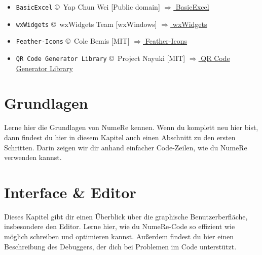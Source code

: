\documentclass[DIV=17, parskip=half]{scrreprt}
\begin{document}
\begin{itemize}
			\item \verb!BasicExcel! \copyright\ Yap Chun Wei [Public domain]
			\href{https://www.codeproject.com/Articles/13852/BasicExcel-A-Class-to-Read-and-Write-to-Microsoft}{$\Rightarrow$ BasicExcel}

			\item \verb!wxWidgets! \copyright\ wxWidgets Team [wxWindows]
			\href{https://www.wxwidgets.org/}{$\Rightarrow$ wxWidgets}

			\item \verb!Feather-Icons! \copyright\ Cole Bemis [MIT]
			\href{https://feathericons.com/}{$\Rightarrow$ Feather-Icons}

			\item \verb!QR Code Generator Library! \copyright\ Project Nayuki [MIT]
			\href{https://www.nayuki.io/page/qr-code-generator-library}{$\Rightarrow$ QR Code Generator Library}
		\end{itemize}
	\chapter{Grundlagen}
		Lerne hier die Grundlagen von NumeRe kennen. Wenn du komplett neu hier bist, dann findest du hier in diesem Kapitel auch einen Abschnitt zu den ersten Schritten. Darin zeigen wir dir anhand einfacher Code-Zeilen, wie du NumeRe verwenden kannst.
		
		
		
		
		
		
		
		
		
		
	
	\chapter{Interface \& Editor}
		Dieses Kapitel gibt dir einen \"Uberblick \"uber die graphische Benutzerberfl\"ache, insbesondere den Editor. Lerne hier, wie du NumeRe-Code so effizient wie m\"oglich schreiben und optimieren kannst. Au\ss erdem findest du hier einen Beschreibung des Debuggers, der dich bei Problemen im Code unterst\"utzt.
		
		
		
		
		
		
		
		
		
		
		
\end{document}
